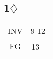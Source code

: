 \documentclass[10pt]{article}
\renewcommand{\c}{$\clubsuit$}
\renewcommand{\d}{$\diamondsuit$}
\newcommand{\h}{$\heartsuit$}
\newcommand{\s}{$\spadesuit$}
\newcommand{\p}{\textsuperscript{+}}
\newenvironment{bidtable}[1][]
{\textbf{#1}
  \begin{adjustwidth}{1em}{}
    \addvspace{2pt}
    \begin{tabbing}
      xxxxxxxx\=xxxxxxxx\=xxxxxxxx\=xxxxxxxx\=xxxxxxxx\=xxxxxxx\=xxxxxxxxx\=xxxxxxxx\=\kill}
{\end{tabbing}\end{adjustwidth}\bigskip}%
\newcommand{\pdfc}{\texorpdfstring{\c{}}{C}}
\newcommand{\pdfd}{\texorpdfstring{\d{}}{D}}
\begin{document}




\subsection{1\pdfd}

\begin{tabular}{c|c}
INV & 9-12 \\
FG  & 13\p \\
\end{tabular}
\end{document}
